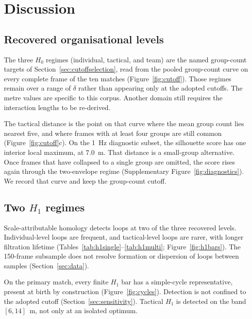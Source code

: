 \section{Discussion}

\subsection{Recovered organisational levels}
\label{sec:disc-levels}

The three $H_0$ regimes
(individual, tactical, and team) are the named group-count targets of
Section~\ref{sec:cutoffselection}, read from the pooled group-count
curve on every complete frame of the
ten matches (Figure~\ref{fig:cutoff}). Those regimes remain over a
range of $\delta$ rather than appearing only at the adopted cutoffs.
The metre values are specific to this corpus. Another domain still
requires the interaction lengths to be re-derived.

The tactical distance is the point on that curve where the mean group
count lies nearest five, and where frames with at least four groups
are still common (Figure~\ref{fig:cutoff}c). On the 1~Hz diagnostic
subset, the silhouette score has one interior local maximum, at
$7.0$~m. That distance is a small-group alternative. Once frames that
have collapsed to a single group are omitted, the score rises again
through the two-envelope regime (Supplementary
Figure~\ref{fig:diagnostics}). We record that curve and keep the
group-count cutoff.

\subsection{Two \texorpdfstring{$H_1$}{} regimes}
\label{sec:disc-homology}

Scale-attributable homology
detects loops at two of the three recovered levels. Individual-level
loops are frequent, and tactical-level loops are rarer, with longer
filtration lifetime (Tables~\ref{tab:h1single}--\ref{tab:h1multi};
Figure~\ref{fig:h1bars}). The 150-frame subsample does not resolve
formation or dispersion of loops between samples
(Section~\ref{sec:data}).

On the primary match, every finite $H_1$ bar has a simple-cycle
representative, present at birth by construction
(Figure~\ref{fig:cycles}). Detection is not confined to the adopted
cutoff (Section~\ref{sec:sensitivity}). Tactical $H_1$ is detected on the
band $[6,14]$~m, not only at an isolated optimum.

